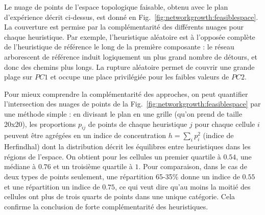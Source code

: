  
Le nuage de points de l'espace topologique faisable, obtenu avec le plan d'expérience décrit ci-dessus, est donné en Fig.~\ref{fig:networkgrowth:feasiblespace}. La couverture est permise par la complémentarité des différents nuages pour chaque heuristique. Par exemple, l'heuristique aléatoire est à l'opposée complète de l'heuristique de référence le long de la première composante : le réseau arborescent de référence induit logiquement un plus grand nombre de détours, et donc des chemins plus longs. La rupture aléatoire permet de couvrir une grande plage sur $PC1$ et occupe une place privilégiée pour les faibles valeurs de $PC2$.



Pour mieux comprendre la complémentarité des approches, on peut quantifier l'intersection des nuages de points de la Fig.~\ref{fig:networkgrowth:feasiblespace} par une méthode simple : en divisant le plan en une grille (qu'on prend de taille 20x20), les proportions $p_{ij}$ de points de chaque heuristique $j$ pour chaque cellule $i$ peuvent être agrégées en un indice de concentration $h = \sum_i p_i^2$ (indice de Herfindhal) dont la distribution décrit les équilibres entre heuristiques dans les régions de l'espace. On obtient pour les cellules un premier quartile à $0.54$, une médiane à $0.76$ et un troisième quartile à $1$. Pour comparaison, dans le cas de deux types de points seulement, une répartition 65-35\% donne un indice de $0.55$ et une répartition un indice de $0.75$, ce qui veut dire qu'au moins la moitié des cellules ont plus de trois quarts de points dans une unique catégorie. Cela confirme la conclusion de forte complémentarité des heuristiques.



